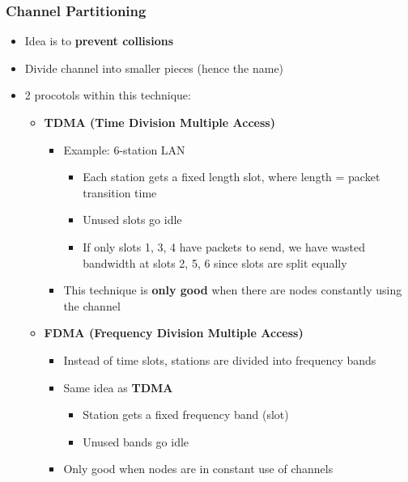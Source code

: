 \documentclass{article}
\begin{document}
\subsubsection{Channel Partitioning}
\begin{itemize}
    \item Idea is to \textbf{prevent collisions}
    \item Divide channel into smaller pieces (hence the name)
    \item 2 procotols within this technique:
    
    \begin{itemize}
        \item \textbf{TDMA (Time Division Multiple Access)}
        \begin{itemize}
            \item Example: 6-station LAN
            \begin{itemize}
                \item Each station gets a fixed length slot, where length = packet transition time
                \item Unused slots go idle
                \item If only slots 1, 3, 4 have packets to send, we have wasted bandwidth at slots
                2, 5, 6 since slots are split equally
            \end{itemize}
            \item This technique is \textbf{only good} when there are nodes constantly using the channel
        \end{itemize}

        \item \textbf{FDMA (Frequency Division Multiple Access)}
        \begin{itemize}
            \item Instead of time slots, stations are divided into frequency bands
            \item Same idea as \textbf{TDMA}
            \begin{itemize}
                \item Station gets a fixed frequency band (slot)
                \item Unused bands go idle
            \end{itemize}
            \item Only good when nodes are in constant use of channels
        \end{itemize}
    \end{itemize}
\end{itemize}
\end{document}
